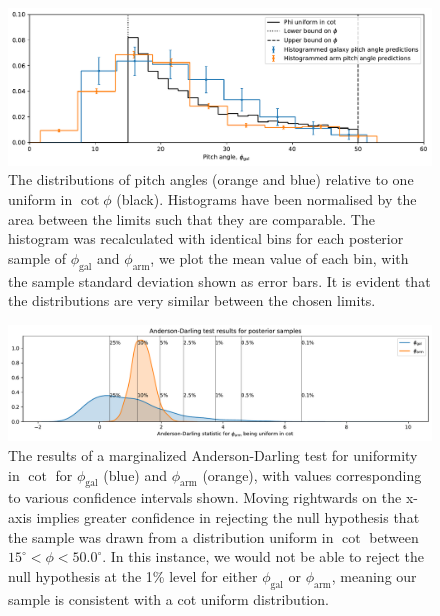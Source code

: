 \begin{figure}
  \includegraphics[width=17.7cm]{plots/phi_distribution_comparison.pdf}
  \caption{The distributions of pitch angles (orange and blue) relative to one uniform in $\cot\phi$ (black). Histograms have been normalised by the area between the limits such that they are comparable. The histogram was recalculated with identical bins for each posterior sample of $\phi_\mathrm{gal}$ and $\phi_\mathrm{arm}$, we plot the mean value of each bin, with the sample standard deviation shown as error bars. It is evident that the distributions are very similar between the chosen limits.}
  \label{fig:pa-cot-distributions}
\end{figure}


\begin{figure}
  \includegraphics[width=17.7cm]{plots/combined_cot_uniform_marginalized_tests.pdf}
  \caption{The results of a marginalized Anderson-Darling test for uniformity in $\cot$ for $\phi_\mathrm{gal}$ (blue) and $\phi_\mathrm{arm}$ (orange), with values corresponding to various confidence intervals shown. Moving rightwards on the x-axis implies greater confidence in rejecting the null hypothesis that the sample was drawn from a distribution uniform in $\cot$ between $15^\circ < \phi < 50.0^\circ$. In this instance, we would not be able to reject the null hypothesis at the 1\% level for either $\phi_\mathrm{gal}$ or $\phi_\mathrm{arm}$, meaning our sample is consistent with a cot uniform distribution.}
  \label{fig:ad-cot-test}
\end{figure}
